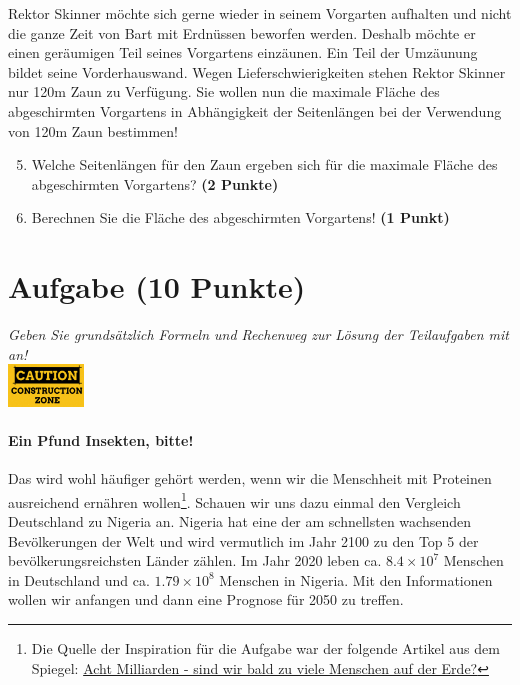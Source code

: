 \documentclass[a4paper, 9pt]{scrartcl}\usepackage[]{graphicx}\usepackage[]{xcolor}
\begin{document}
Rektor Skinner m{\"o}chte sich gerne wieder in seinem Vorgarten aufhalten und
nicht die ganze Zeit von Bart mit Erdn{\"u}ssen beworfen werden. Deshalb m{\"o}chte
er einen ger{\"a}umigen Teil seines Vorgartens einz{\"a}unen. Ein Teil der
Umz{\"a}unung bildet seine Vorderhauswand. Wegen Lieferschwierigkeiten stehen
Rektor Skinner nur 120m Zaun zu Verf{\"u}gung. Sie wollen nun die
maximale Fl{\"a}che des abgeschirmten Vorgartens in Abh{\"a}ngigkeit der
Seitenl{\"a}ngen bei der Verwendung von 120m Zaun bestimmen!

\begin{enumerate}
  \setcounter{enumi}{4}  
\item  Welche Seitenl{\"a}ngen f{\"u}r den Zaun ergeben sich f{\"u}r die
  maximale Fl{\"a}che des abgeschirmten Vorgartens? \textbf{(2 Punkte)}
\item Berechnen Sie die Fl{\"a}che des abgeschirmten Vorgartens! \textbf{(1
    Punkt)}
\end{enumerate}

 
\clearpage

\section{Aufgabe \hfill (10 Punkte)}

\textit{Geben Sie grunds{\"a}tzlich Formeln und Rechenweg zur L{\"o}sung der
  Teilaufgaben mit an!} \\[1Ex]

\hfill\href{}{\includegraphics[width = 2cm]{img/caution}} %
\hspace{2Ex}




\paragraph{Ein Pfund Insekten, bitte!} Das wird wohl h{\"a}ufiger geh{\"o}rt 
werden, wenn wir die Menschheit mit Proteinen ausreichend ern{\"a}hren wollen\footnote{Die Quelle der Inspiration f{\"u}r die Aufgabe war der folgende
  Artikel aus dem Spiegel: \href{https://www.spiegel.de/ausland/ueberbevoelkerung-acht-milliarden-sind-wir-bald-zu-viele-menschen-auf-der-erde-a-3f20c7bc-3d60-4440-9f52-eb338db207f5}{Acht Milliarden - sind wir bald zu viele Menschen
  auf der Erde?}}. Schauen wir uns dazu einmal den Vergleich Deutschland zu
Nigeria an. Nigeria hat eine der am schnellsten wachsenden Bev{\"o}lkerungen der
Welt und wird vermutlich im Jahr 2100 zu den Top 5 der bev{\"o}lkerungsreichsten
L{\"a}nder z{\"a}hlen. Im Jahr 2020 leben ca. \ensuremath{8.4\times 10^{7}} Menschen in Deutschland und
ca. \ensuremath{1.79\times 10^{8}} Menschen in Nigeria. Mit den Informationen wollen wir
anfangen und dann eine Prognose f{\"u}r 2050 zu treffen. \\  
\end{document}
